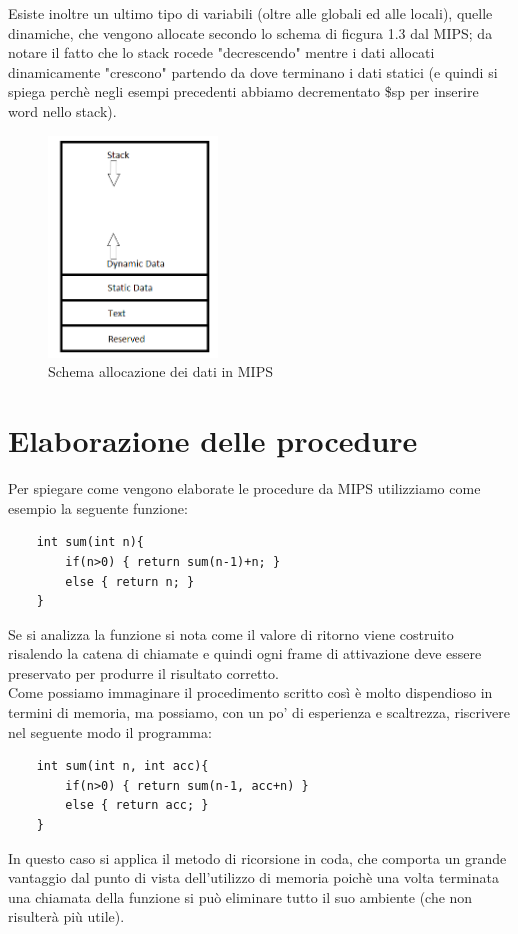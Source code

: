 \documentclass[class=book, crop=false]{standalone}
\begin{document}
Esiste inoltre un ultimo tipo di variabili (oltre alle globali ed alle locali), quelle dinamiche, che vengono allocate secondo lo schema di ficgura 1.3 dal MIPS; da notare il fatto che lo stack rocede "decrescendo" mentre i dati allocati dinamicamente "crescono"  partendo da dove terminano i dati statici (e quindi si spiega perchè negli esempi precedenti abbiamo decrementato \$sp per inserire word nello stack).
\begin{figure}[H]
	\centering
	\caption{Schema allocazione dei dati in MIPS}
	\includegraphics[width=0.4\textwidth,keepaspectratio]{Dove-finiscono-le-variabili}
\end{figure}

\section{Elaborazione delle procedure}
Per spiegare come vengono elaborate le procedure da MIPS utilizziamo come esempio la seguente funzione:
\begin{verbatim}
	int sum(int n){
		if(n>0) { return sum(n-1)+n; }
		else { return n; }
	}
\end{verbatim}

Se si analizza la funzione si nota come il valore di ritorno viene costruito risalendo la catena di chiamate e quindi ogni frame di attivazione deve essere preservato per produrre il risultato corretto.\\
Come possiamo immaginare il procedimento scritto così è  molto dispendioso in termini di memoria, ma possiamo, con un po' di esperienza e scaltrezza, riscrivere nel seguente modo il programma:
\begin{verbatim}
	int sum(int n, int acc){
		if(n>0) { return sum(n-1, acc+n) }
		else { return acc; }
	}
\end{verbatim}
In questo caso si applica il metodo di ricorsione in coda, che comporta un grande vantaggio dal punto di vista dell'utilizzo di memoria poichè una volta terminata una chiamata della funzione si può eliminare tutto il suo ambiente (che non risulterà più utile).
\end{document}
